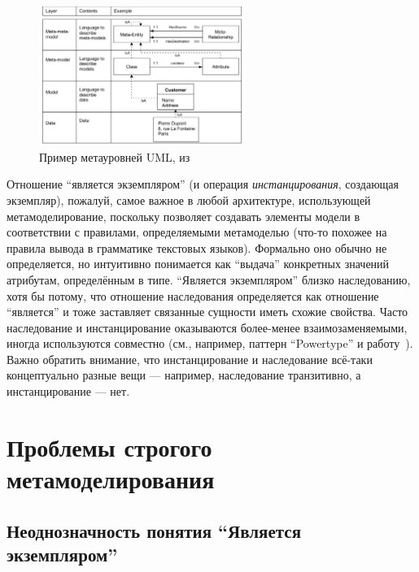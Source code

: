 \documentclass[a5paper]{article}
\begin{document}
\begin{figure}
	\begin{center}
		\includegraphics[width=0.6\textwidth]{bezivinExample.png}
	\end{center}
	\caption{Пример метауровней UML, из~\cite{bezivin1997ontology}}
	\label{figure:metalevelsExample}
\end{figure}

Отношение ``является экземпляром'' (и операция \textit{инстанцирования}, создающая экземпляр), пожалуй, самое важное в любой архитектуре, использующей метамоделирование, поскольку позволяет создавать элементы модели в соответствии с правилами, определяемыми метамоделью (что-то похожее на правила вывода в грамматике текстовых языков). Формально оно обычно не определяется, но интуитивно понимается как ``выдача'' конкретных значений атрибутам, определённым в типе. ``Является экземпляром'' близко наследованию, хотя бы потому, что отношение наследования определяется как отношение ``является'' и тоже заставляет связанные сущности иметь схожие свойства. Часто наследование и инстанцирование оказываются более-менее взаимозаменяемыми, иногда используются совместно (см., например, паттерн ``Powertype'' и работу~\cite{gonzalez2006powertype}). Важно обратить внимание, что инстанцирование и наследование всё-таки концептуально разные вещи --- например, наследование транзитивно, а инстанцирование --- нет.

\section{Проблемы строгого метамоделирования}

\subsection{Неоднозначность понятия ``Является экземпляром''}
\end{document}
